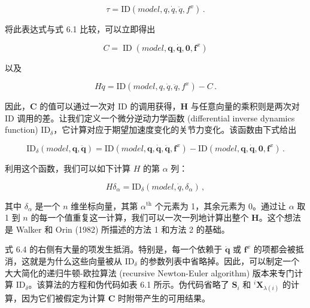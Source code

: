 \documentclass[10pt,a4paper]{book}
\theoremstyle{thmstyle} %
\theoremstyle{defstyle} %
\theoremstyle{prostyle} %
\begin{document}
$$
\tau = \mathrm { I D } ( m o d e l , q , \dot { q } , \ddot { q } , f ^{x} ) \, .
$$



将此表达式与式 6.1 比较，可以立即得出



$$
C = \operatorname { I D } ( m o d e l , \boldsymbol{ q } , \dot { \boldsymbol{ q } } , \mathbf { 0 } , \boldsymbol{ f } ^{x} )
$$



以及



$$
H \ddot { q } = \mathrm { I D } ( m o d e l , q , \dot { q } , \ddot { q } , f ^{x} ) - C \, .
$$



因此，$\boldsymbol{C}$ 的值可以通过一次对 ID 的调用获得，$\boldsymbol{H}$ 与任意向量的乘积则是两次对 ID 调用的差。让我们定义一个微分逆动力学函数 (differential inverse dynamics function) $\mathrm{ID}_{\delta}$，它计算对应于期望加速度变化的关节力变化。该函数由下式给出



$$
\mathrm { I D } _ { \delta } ( m o d e l , \boldsymbol{ q } , \ddot { \boldsymbol{ q } } ) = \mathrm { I D } ( m o d e l , \boldsymbol{ q } , \dot { \boldsymbol{ q } } , \ddot { \boldsymbol{ q } } , \boldsymbol{ f } ^{x} ) - \mathrm { I D } ( m o d e l , \boldsymbol{ q } , \dot { \boldsymbol{ q } } , \mathbf { 0 } , \boldsymbol{ f } ^{x} ) \, .
$$



利用这个函数，我们可以如下计算 $H$ 的第 $\alpha$ 列：



$$
H \delta _ { \alpha } = \mathrm { I D } _ { \delta } ( m o d e l , \dot { q } , \delta _ { \alpha } ) \, ,
$$



其中 $\delta_{\alpha}$ 是一个 $n$ 维坐标向量，其第 $\alpha^{\text{th}}$ 个元素为 1，其余元素为 0。通过让 $\alpha$ 取 1 到 $n$ 的每一个值重复这一计算，我们可以一次一列地计算出整个 $\mathbf{H}$。这个想法是 Walker 和 Orin (1982) 所描述的方法 1 和方法 2 的基础。



式 6.4 的右侧有大量的项发生抵消。特别是，每一个依赖于 $\dot{\boldsymbol{q}}$ 或 $\boldsymbol{f}^{x}$ 的项都会被抵消，这就是为什么这些向量被从 $\mathrm{ID}_{\delta}$ 的参数列表中省略掉。因此，可以制定一个大大简化的递归牛顿-欧拉算法 (recursive Newton-Euler algorithm) 版本来专门计算 $\mathrm{ID}_{\delta}$。该算法的方程和伪代码如表 6.1 所示。伪代码省略了 $\boldsymbol{S}_{i}$ 和 ${}^{i}\boldsymbol{X}_{\lambda(i)}$ 的计算，因为它们被假定为计算 $\boldsymbol{C}$ 时附带产生的可用结果。
\end{document}
